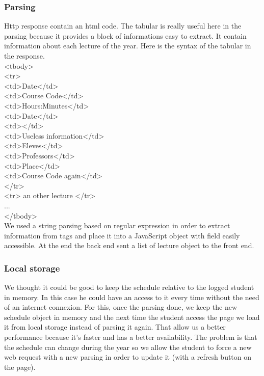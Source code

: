 \documentclass[11pt, a4paper]{report}
\newcommand\tab[1][0.5cm]{\hspace*{#1}}
\begin{document}
\subsubsection{Parsing}
Http response contain an html code. The tabular is really useful here in the parsing because it provides a block of informations easy to extract. It contain information about each lecture of the year. Here is the syntax of the tabular in the response.\\
<tbody>\\
\tab <tr>\\
\tab \tab <td>Date</td>\\
\tab \tab <td>Course Code</td>\\
\tab \tab <td>Hours:Minutes</td>\\
\tab \tab <td>Date</td>\\
\tab \tab <td></td>\\
\tab \tab <td>Useless information</td>\\
\tab \tab <td>Eleves</td>\\
\tab \tab <td>Professors</td>\\
\tab \tab <td>Place</td>\\
\tab \tab <td>Course Code again</td>\\
\tab </tr>\\
\tab <tr> an other lecture </tr>\\
\tab ...\\
</tbody>\\
We used a string parsing based on regular expression in order to extract information from tags and place it into a JavaScript object with field easily accessible. At the end the back end sent a list of lecture object to the front end.

\subsubsection{Local storage}
We thought it could be good to keep the schedule relative to the logged student in memory. In this case he could have an access to it every time without the need of an internet connexion. For this, once the parsing done, we keep the new schedule object in memory and the next time the student access the page we load it from local storage instead of parsing it again. That allow us a better performance because it's faster and has a better availability. The problem is that the schedule can change during the year so we allow the student to force a new web request with a new parsing in order to update it (with a refresh button on the page).
\end{document}
